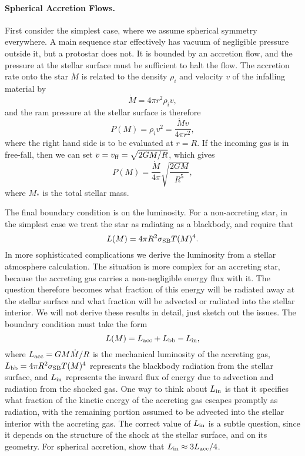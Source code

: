 \paragraph{Spherical Accretion Flows.} First consider the simplest case, where we assume spherical symmetry everywhere. A main sequence star effectively has vacuum of negligible pressure outside it, but a protostar does not. It is bounded by an accretion flow, and  the pressure at the stellar surface must be sufficient to halt the flow. The accretion rate onto the star $\dot{M}$ is related to the density $\rho_i$ and velocity $v$ of the infalling material by
\begin{equation}
\dot{M} = 4\pi r^2 \rho_i v,
\end{equation}
and the ram pressure at the stellar surface is therefore
\begin{equation}
P(M) = \rho_i v^2 = \frac{\dot{M} v}{4\pi r^2},
\end{equation}
where the right hand side is to be evaluated at $r=R$. If the incoming gas is in free-fall, then we can set $v = v_{\rm ff} = \sqrt{2GM/R}$, which gives
\begin{equation}
\label{pbound1}
P(M) = \frac{\dot{M}}{4\pi} \sqrt{\frac{2 G M}{R^5}},
\end{equation}
where $M_*$ is the total stellar mass. 

The final boundary condition is on the luminosity. For a non-accreting star, in the simplest case we treat the star as radiating as a blackbody, and require that
\begin{equation}
\label{lbound2}
L(M)=4\pi R^2 \sigma_{\rm SB} T(M)^4.
\end{equation}
In more sophisticated complications we derive the luminosity from a stellar atmosphere calculation. The situation is more complex for an accreting star, because the accreting gas carries a non-negligible energy flux with it. The question therefore becomes what fraction of this energy will be radiated away at the stellar surface and what fraction will be advected or radiated into the stellar interior. We will not derive these results in detail, just sketch out the issues. The boundary condition must take the form
\begin{equation}
\label{lbound1}
L(M) = L_{\rm acc} + L_{\rm bb} - L_{\rm in},
\end{equation}
where $L_{\rm acc}=G M \dot{M}/R$ is the mechanical luminosity of the accreting gas, $L_{\rm bb} = 4\pi R^2 \sigma_{\rm SB} T(M)^4$ represents the blackbody radiation from the stellar surface, and $L_{\rm in}$ represents the inward flux of energy due to advection and radiation from the shocked gas. One way to think about $L_{\rm in}$ is that it specifies what fraction of the kinetic energy of the accreting gas escapes promptly as radiation, with the remaining portion assumed to be advected into the stellar interior with the accreting gas. The correct value of $L_{\rm in}$ is a subtle question, since it depends on the structure of the shock at the stellar surface, and on its geometry. For spherical accretion, \citet{stahler80a, stahler80b, stahler81a} show that $L_{\rm in}\approx 3 L_{\rm acc}/4$. 

